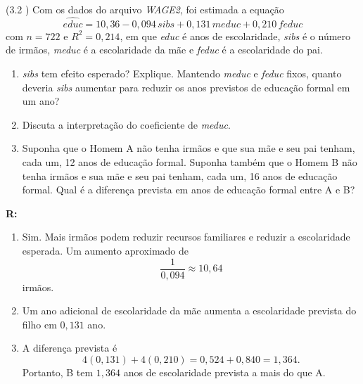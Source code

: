 \documentclass[12pt,letterpaper, onecolumn]{exam}
\renewenvironment{solution}
  {\par\noindent\textbf{R:}\enspace\color{blue}}
  {\par\color{black}}
\begin{document}
\begin{questions}
\question (3.2 \citep{wooldridge2010}) Com os dados do arquivo \textit{WAGE2}, foi estimada a equação
\[
\widehat{educ}=10{,}36-0{,}094\,sibs+0{,}131\,meduc+0{,}210\,feduc
\]
com \(n=722\) e \(R^2=0{,}214\), em que \textit{educ} é anos de escolaridade, \textit{sibs} é o número de irmãos, \textit{meduc} é a escolaridade da mãe e \textit{feduc} é a escolaridade do pai.
\begin{enumerate}[label=(\alph*)]
    \item \textit{sibs} tem efeito esperado? Explique. Mantendo \textit{meduc} e \textit{feduc} fixos, quanto deveria \textit{sibs} aumentar para reduzir os anos previstos de educação formal em um ano?
    \item Discuta a interpretação do coeficiente de \textit{meduc}.
    \item Suponha que o Homem A não tenha irmãos e que sua mãe e seu pai tenham, cada um, 12 anos de educação formal. Suponha também que o Homem B não tenha irmãos e sua mãe e seu pai tenham, cada um, 16 anos de educação formal. Qual é a diferença prevista em anos de educação formal entre A e B?
\end{enumerate}

\begin{solution}
\begin{enumerate}[label=(\alph*)]
    \item Sim. Mais irmãos podem reduzir recursos familiares e reduzir a escolaridade esperada. Um aumento aproximado de
    \[
    \frac{1}{0{,}094}\approx 10{,}64
    \]
    irmãos.
    \item Um ano adicional de escolaridade da mãe aumenta a escolaridade prevista do filho em \(0{,}131\) ano.
    \item A diferença prevista é
    \[
    4(0{,}131)+4(0{,}210)=0{,}524+0{,}840=1{,}364.
    \]
    Portanto, B tem \(1{,}364\) anos de escolaridade prevista a mais do que A.
\end{enumerate}
\end{solution}


\end{questions}
\end{document}
